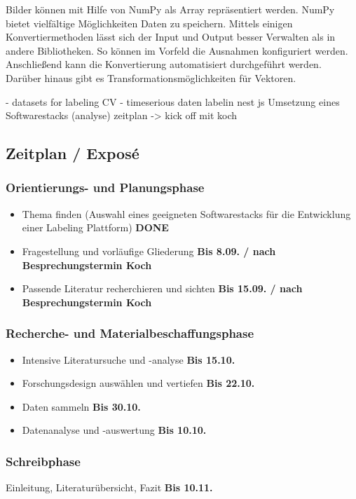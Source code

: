 Bilder können mit Hilfe von NumPy als Array repräsentiert werden. NumPy bietet vielfältige Möglichkeiten Daten zu speichern. Mittels einigen Konvertiermethoden lässt sich der Input und Output besser Verwalten als in andere Bibliotheken. So können im Vorfeld die Ausnahmen konfiguriert werden. Anschließend kann die Konvertierung automatisiert durchgeführt werden.
Darüber hinaus gibt es Transformationsmöglichkeiten für Vektoren.


- datasets for labeling CV
- timeserious daten labelin
nest js
Umsetzung eines Softwarestacks
(analyse)
zeitplan -> kick off mit koch

\subsection*{Zeitplan / Exposé}
\subsubsection*{Orientierungs- und Planungsphase}
\begin{itemize}
    \item Thema finden (Auswahl eines geeigneten Softwarestacks für die Entwicklung einer Labeling Plattform) \textbf{DONE}
    \item Fragestellung und vorläufige Gliederung \textbf{Bis 8.09. / nach Besprechungstermin Koch}
    \item Passende Literatur recherchieren und sichten \textbf{Bis 15.09. / nach Besprechungstermin Koch}
\end{itemize}

\subsubsection*{Recherche- und Materialbeschaffungsphase}
\begin{itemize}
    \item Intensive Literatursuche und -analyse \textbf{Bis 15.10.}
    \item Forschungsdesign auswählen und vertiefen \textbf{Bis 22.10.}
    \item Daten sammeln \textbf{Bis 30.10.}
    \item Datenanalyse und -auswertung \textbf{Bis 10.10.} 
\end{itemize}


\subsubsection*{Schreibphase}
Einleitung, Literaturübersicht, Fazit \textbf{Bis 10.11.}

